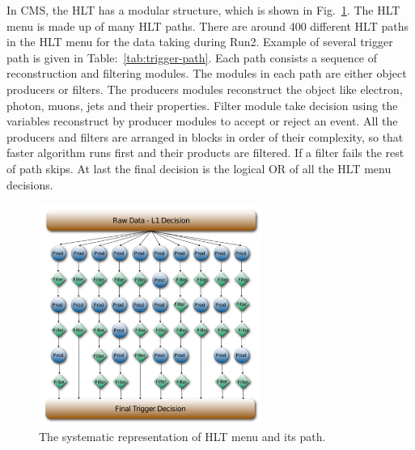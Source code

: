 {{{In CMS, the HLT has a modular structure, which is shown in Fig.~\ref{fig:HLT_menue_workflow}. The HLT menu is made up of many HLT paths. There are around 400 different HLT paths in the HLT menu for the data taking during Run2. Example of several trigger path is given in Table:~\ref{tab:trigger-path}. Each path consists a sequence of reconstruction and filtering modules.  The modules in each path are either object producers or filters. The producers modules reconstruct the object like electron, photon,  muons, jets and their properties. Filter module take decision using the variables reconstruct by producer modules to accept or reject an event. All the producers and filters are arranged in blocks in order of their complexity, so that faster algorithm runs first and their products are filtered. If a filter fails the rest of path skips. At last the final decision is the logical OR of all the HLT menu decisions.
\begin{figure}[htbp]
	\centering
	\includegraphics[width=0.65\textwidth]{figures/LHC/HLT_menu_workflow.png}
	\caption{The systematic representation of HLT menu and its path\cite{Perrotta2015}.}
	\label{fig:HLT_menue_workflow}
\end{figure}

}}}
